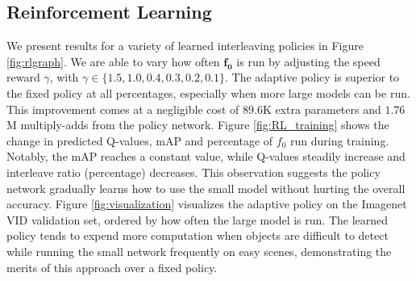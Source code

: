 \documentclass[10pt,twocolumn,letterpaper]{article}
\begin{document}
\subsection{Reinforcement Learning}
\label{sec:4.3}
We present results for a variety of learned interleaving policies in Figure \ref{fig:rlgraph}. We are able to vary how often $\mathbf{f_0}$ is run by adjusting the speed reward $\gamma$, with $\gamma \in \{1.5, 1.0, 0.4, 0.3, 0.2, 0.1\}$. The adaptive policy is superior to the fixed policy at all percentages, especially when more large models can be run. This improvement comes at a negligible cost of $89.6$K extra parameters and $1.76$M multiply-adds from the policy network. Figure \ref{fig:RL_training} shows the change in predicted Q-values, mAP and percentage of $f_0$ run during training. Notably, the mAP reaches a constant value, while Q-values steadily increase and interleave ratio (percentage) decreases. This observation suggests the policy network gradually learns how to use the small model without hurting the overall accuracy. Figure \ref{fig:visualization} visualizes the adaptive policy on the Imagenet VID validation set, ordered by how often the large model is run. The learned policy tends to expend more computation when objects are difficult to detect while running the small network frequently on easy scenes, demonstrating the merits of this approach over a fixed policy.


\begin{figure*}[!htb]
\centering
{}
\caption{Q-values, mAP and percentage of $f_0$ run during RL training. The blue curves correspond to training and the red curves evaluation. The x-axis is the number of training iterations.}
\label{fig:RL_training}
\end{figure*}
\end{document}
